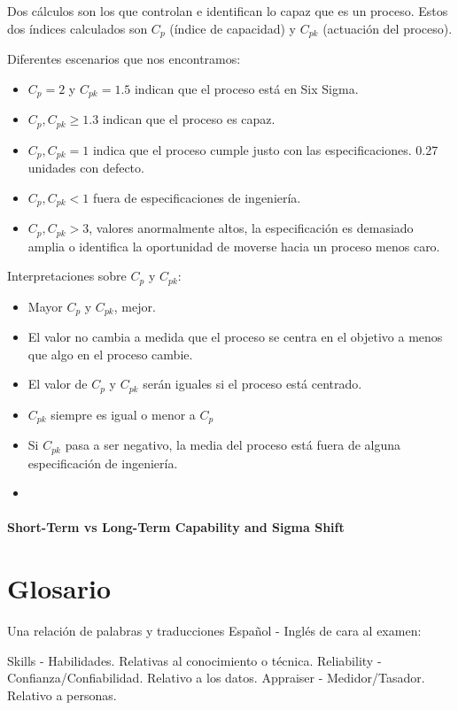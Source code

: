 \documentclass[]{article}
\begin{document}
Dos cálculos son los que controlan e identifican lo capaz que es un proceso. Estos dos índices calculados son $C_p$ (índice de capacidad) y $C_{pk}$ (actuación del proceso).

Diferentes escenarios que nos encontramos: 
\begin{itemize}
	\item $C_p = 2$ y $C_{pk} = 1.5$ indican que el proceso está en Six Sigma.
	\item $C_p, C_{pk} \geq 1.3$ indican que el proceso es capaz.
	\item $C_p, C_{pk} = 1$ indica que el proceso cumple justo con las especificaciones. 0.27 unidades con defecto.
	\item $C_p, C_{pk} < 1$ fuera de especificaciones de ingeniería.
	\item $C_p, C_{pk} > 3$, valores anormalmente altos, la especificación es demasiado amplia o identifica la oportunidad de moverse hacia un proceso menos caro.
\end{itemize}

Interpretaciones sobre $C_p$ y $C_{pk}$:
\begin{itemize}
	\item Mayor $C_p$ y $C_{pk}$, mejor.
	\item El valor no cambia a medida que el proceso se centra en el objetivo a menos que algo en el proceso cambie.
	\item El valor de $C_p$ y $C_{pk}$ serán iguales si el proceso está centrado.
	\item $C_{pk}$ siempre es igual o menor a $C_p$
	\item Si $C_{pk}$ pasa a ser negativo, la media del proceso está fuera de alguna especificación de ingeniería.
	\item 	
\end{itemize}

\subsection{Short-Term vs Long-Term Capability and Sigma Shift}


\pagebreak[4]
\part{Glosario}

Una relación de palabras y traducciones Español - Inglés de cara al examen:

Skills - Habilidades. Relativas al conocimiento o técnica.
Reliability - Confianza/Confiabilidad. Relativo a los datos.
Appraiser - Medidor/Tasador. Relativo a personas.
\end{document}
